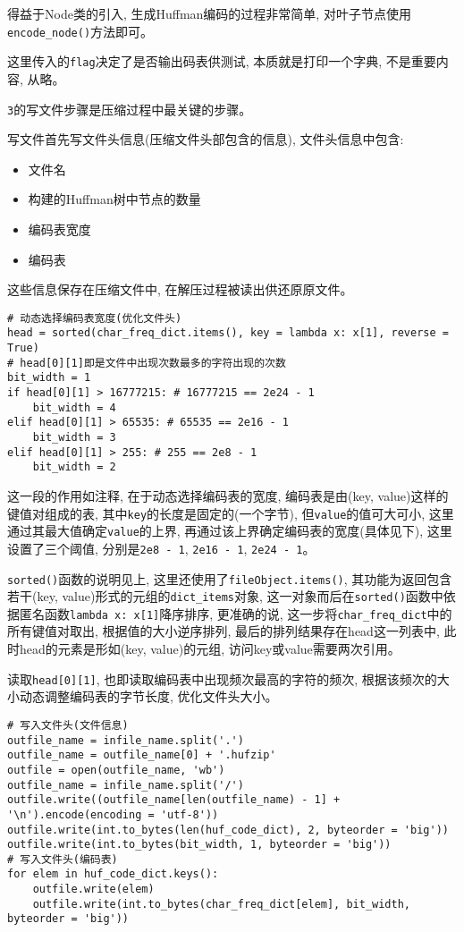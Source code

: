 \documentclass[a4paper]{ctexart}
\begin{document}
得益于Node类的引入, 生成Huffman编码的过程非常简单, 对叶子节点使用\texttt{encode\_node()}方法即可。

这里传入的\texttt{flag}决定了是否输出码表供测试, 本质就是打印一个字典, 不是重要内容, 从略。

\texttt{3}的写文件步骤是压缩过程中最关键的步骤。

写文件首先写文件头信息(压缩文件头部包含的信息), 文件头信息中包含:

\begin{itemize}
\item
  文件名
\item
  构建的Huffman树中节点的数量
\item
  编码表宽度
\item
  编码表
\end{itemize}

这些信息保存在压缩文件中, 在解压过程被读出供还原原文件。

{\setmainfont{Courier New Bold}              
\begin{lstlisting}
# 动态选择编码表宽度(优化文件头)
head = sorted(char_freq_dict.items(), key = lambda x: x[1], reverse = True)
# head[0][1]即是文件中出现次数最多的字符出现的次数
bit_width = 1
if head[0][1] > 16777215: # 16777215 == 2e24 - 1
    bit_width = 4
elif head[0][1] > 65535: # 65535 == 2e16 - 1
    bit_width = 3
elif head[0][1] > 255: # 255 == 2e8 - 1
    bit_width = 2
\end{lstlisting}}

这一段的作用如注释, 在于动态选择编码表的宽度, 编码表是由(key, value)这样的键值对组成的表, 其中\texttt{key}的长度是固定的(一个字节), 但\texttt{value}的值可大可小, 这里通过其最大值确定\texttt{value}的上界, 再通过该上界确定编码表的宽度(具体见下), 这里设置了三个阈值, 分别是\texttt{2e8\ -\ 1}, \texttt{2e16\ -\ 1}, \texttt{2e24\ -\ 1}。

\texttt{sorted()}函数的说明见上, 这里还使用了\texttt{fileObject.items()}, 其功能为返回包含若干(key,
value)形式的元组的\texttt{dict\_items}对象, 这一对象而后在\texttt{sorted()}函数中依据匿名函数\texttt{lambda\ x:\ x{[}1{]}}降序排序, 更准确的说, 这一步将\texttt{char\_freq\_dict}中的所有键值对取出,
根据值的大小逆序排列, 最后的排列结果存在head这一列表中, 此时head的元素是形如(key, value)的元组, 访问key或value需要两次引用。

读取\texttt{head{[}0{]}{[}1{]}}, 也即读取编码表中出现频次最高的字符的频次, 根据该频次的大小动态调整编码表的字节长度, 优化文件头大小。

{\setmainfont{Courier New Bold}              
\begin{lstlisting}
# 写入文件头(文件信息)
outfile_name = infile_name.split('.')
outfile_name = outfile_name[0] + '.hufzip'
outfile = open(outfile_name, 'wb')
outfile_name = infile_name.split('/')
outfile.write((outfile_name[len(outfile_name) - 1] + '\n').encode(encoding = 'utf-8'))
outfile.write(int.to_bytes(len(huf_code_dict), 2, byteorder = 'big'))
outfile.write(int.to_bytes(bit_width, 1, byteorder = 'big'))
# 写入文件头(编码表)
for elem in huf_code_dict.keys():
    outfile.write(elem)
    outfile.write(int.to_bytes(char_freq_dict[elem], bit_width, byteorder = 'big'))
\end{lstlisting}}
\end{document}
